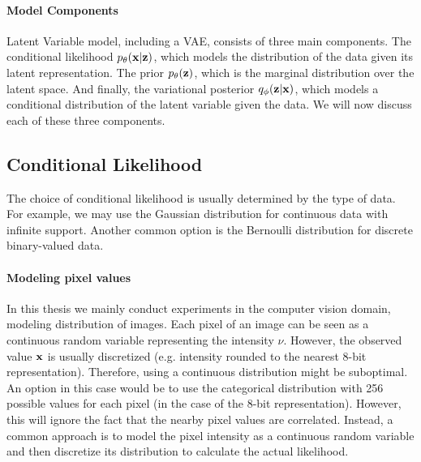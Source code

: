\paragraph{Model Components}
Latent Variable model, including a VAE, consists of three main components. The conditional likelihood $p_{\theta}({\mathbf{x}}|{\mathbf{z}})$, which models the distribution of the data given its latent representation. The prior $p_{\theta}({\mathbf{z}})$, which is the marginal distribution over the latent space. And finally, the variational posterior $q_{\phi}({\mathbf{z}}|{\mathbf{x}})$, which models a conditional distribution of the latent variable given the data. We will now discuss each of these three components.

\subsection{Conditional Likelihood}
The choice of conditional likelihood is usually determined by the type of data. For example, we may use the Gaussian distribution for continuous data with infinite support. Another common option is the Bernoulli distribution for discrete binary-valued data. 

\paragraph{Modeling pixel values}
In this thesis we mainly conduct experiments in the computer vision domain, modeling distribution of images.
Each pixel of an image can be seen as a continuous random variable representing the intensity $\nu$. 
However, the observed value ${\mathbf{x}}$ is usually discretized (e.g. intensity rounded to the nearest 8-bit representation). 
Therefore, using a continuous distribution might be suboptimal.
An option in this case would be to use the categorical distribution with 256 possible values for each pixel (in the case of the 8-bit representation). However, this will ignore the fact that the nearby pixel values are correlated. 
Instead, a common approach is to model the pixel intensity as a continuous random variable and then discretize its distribution to calculate the actual likelihood. 


